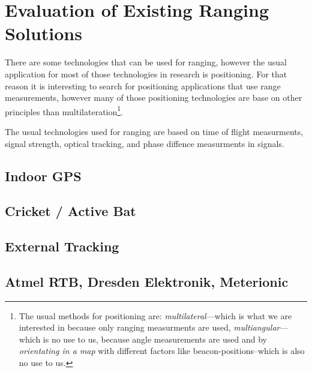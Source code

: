 \section{Evaluation of Existing Ranging Solutions}
There are some technologies that can be used for ranging, however the usual application for most of those technologies in research is positioning.
For that reason it is interesting to search for positioning applications that use range measurements, however many of those positioning technologies are base on other principles than multilateration\footnote{The usual methods for positioning are: \emph{multilateral}—which is what we are interested in because only ranging measurments are used, \emph{multiangular}—which is no use  to us, because angle measurements are used and by \emph{orientating in a map} with different factors like beacon-positions–which is also no use to us.}.

The usual technologies used for ranging are based on time of flight measurments, signal strength, optical tracking, and phase diffence measurments in signals.

\subsection{Indoor GPS}
\subsection{Cricket / Active Bat}
\subsection{External Tracking}
\subsection{Atmel RTB, Dresden Elektronik, Meterionic}
